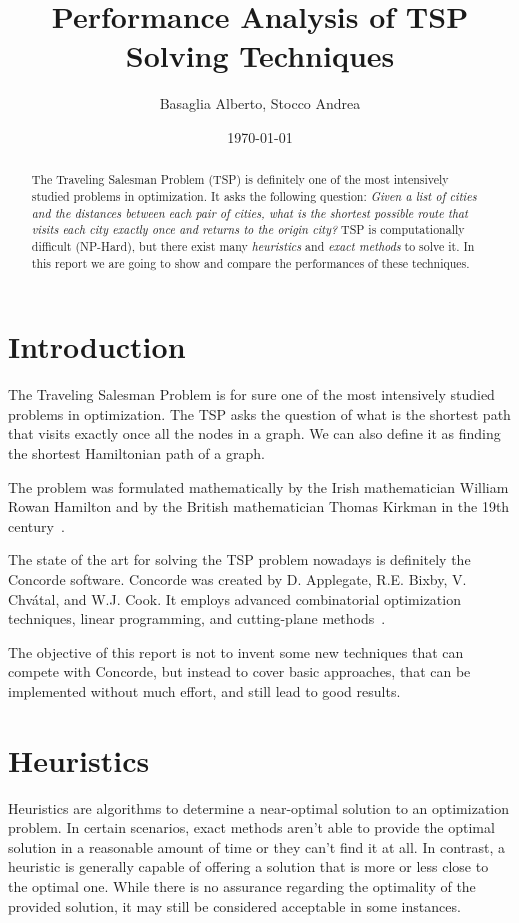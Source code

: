 \documentclass{article}
\title{Performance Analysis of TSP Solving Techniques}
\author{Basaglia Alberto, Stocco Andrea}
\date{\today}
\begin{document}
\pagestyle{fancy}

\maketitle

\begin{abstract}
The Traveling Salesman Problem (TSP) is definitely one of the most intensively studied problems in optimization.
It asks the following question:
\textit{Given a list of cities and the distances between each pair of cities, what is the shortest possible route
that visits each city exactly once and returns to the origin city?}
TSP is computationally difficult (NP-Hard), but there exist many \textit{heuristics} and \textit{exact methods} to solve it.
In this report we are going to show and compare the performances of these
techniques.
\end{abstract}

\section{Introduction}
The Traveling Salesman Problem is for sure one of the most intensively studied problems in
optimization. The TSP asks the question of what is the shortest path that visits exactly
once all the nodes in a graph.
We can also define it as finding the shortest Hamiltonian path of a graph.

The problem was formulated mathematically by the Irish mathematician William Rowan
Hamilton and by the British mathematician Thomas Kirkman in the 19th century~\cite{biggs1986graph}.

The state of the art for solving the TSP problem nowadays is definitely the Concorde
software. Concorde was created by  D. Applegate, R.E. Bixby, V. Chvátal, and W.J. Cook.
It employs advanced combinatorial optimization techniques, linear programming, and cutting-plane methods~\cite{applegate1998solution}\cite{tuHu2022analyzing}.

The objective of this report is not to invent some new techniques that can compete with Concorde,
but instead to cover basic approaches, that can be implemented without much effort, and still lead
to good results.

\section{Heuristics}
Heuristics are algorithms to determine a near-optimal solution to an optimization problem. In certain scenarios,
exact methods aren't able to provide the optimal solution in a reasonable amount of time or they can't find it
at all. In contrast, a heuristic is generally capable of offering a solution that is more or less close to
the optimal one.
While there is no assurance regarding the optimality of the provided solution, it may still be considered
acceptable in some instances.
\end{document}
